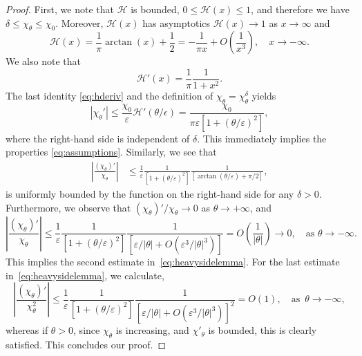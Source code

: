 \documentclass[10pt,letterpaper,twoside]{amsart}
\theoremstyle{definition}{\newtheorem{definition}[lemma]{Definition}}
\theoremstyle{note}{\newtheorem{claim}{Claim}[section]
\newtheorem*{claim*}{Claim}}
\numberwithin{equation}{section}
\begin{document}
\begin{proof}
First, we note that $\mathcal{H}$ is bounded, $0\le \mathcal{H}(x) \le 1$, and therefore we have $\delta \le \chi_\theta \le \chi_0$. Moreover, $\mathcal{H}(x)$ has asymptotics $\mathcal{H}(x) \to 1$ as $x\to \infty$ and 
\begin{equation}
\label{eq:asymp-inf}
\mathcal{H}(x) = \frac{1}{\pi} \arctan(x) + \frac{1}{2} 
= - \frac{1}{\pi x} + O\left(\frac{1}{x^3}\right), \quad x\to -\infty.
\end{equation}
We also note that
\begin{equation}
\label{eq:hderiv}
\mathcal{H}'(x) = \frac{1}{\pi} \frac{1}{1+x^2}.
\end{equation}
The last identity \eqref{eq:hderiv} and the definition of $\chi_\theta = \chi^\delta_\theta$ yields
\[
|\chi_\theta'| 
\le \frac{\chi_0}{\varepsilon} \mathcal{H}'(\theta/\epsilon)
= \frac{\chi_0}{\pi\varepsilon \left[1+(\theta/\varepsilon)^2\right]},
\]
where the right-hand side is independent of $\delta$. This immediately implies the properties \eqref{eq:assumptions}. Similarly, we see that
\begin{align*}
\left|
\frac{(\chi_{\theta})'}{\chi_{\theta}}
\right|
&\le
 \frac{1}{\varepsilon} \frac{1}{\left[ 1+(\theta/\varepsilon)^2 \right]} \frac{1}{\left[\arctan(\theta/\varepsilon) + \pi/2\right]},
\end{align*}
is uniformly bounded by the function on the right-hand side for any $\delta>0$. Furthermore, we observe that $(\chi_\theta)'/\chi_\theta \to 0$ as $\theta \to +\infty$, and
\[
\left|
\frac{(\chi_{\theta})'}{\chi_{\theta}}
\right|
\le \frac{1}{\varepsilon}  \frac{1}{\left[ 1+(\theta/\varepsilon)^2 \right]} \frac{1}{\left[\varepsilon/|\theta| + O(\varepsilon^3/|\theta|^3)\right]} 
= 
O\left( \frac{1}{|\theta|} \right)
\to 0, \quad \text{as } \theta \to -\infty.
\]
This implies the second estimate in~\eqref{eq:heavysidelemma}.
For the last estimate in~\eqref{eq:heavysidelemma}, we calculate,
\[
\left|
\frac{(\chi_{\theta})'}{\chi_{\theta}^2}
\right|
\le \frac{1}{\varepsilon}  \frac{1}{\left[ 1+(\theta/\varepsilon)^2 \right]} \frac{1}{\left[\varepsilon/|\theta| + O(\varepsilon^3/|\theta|^3)\right]^2} 
= 
O\left( 1 \right),\quad \text{as } \, \theta\to-\infty,
\]
whereas if $\theta>0$, since $\chi_\theta$ is increasing, and $\chi'_\theta$ is bounded, this is clearly satisfied.
This concludes our proof.
\end{proof}
\end{document}
